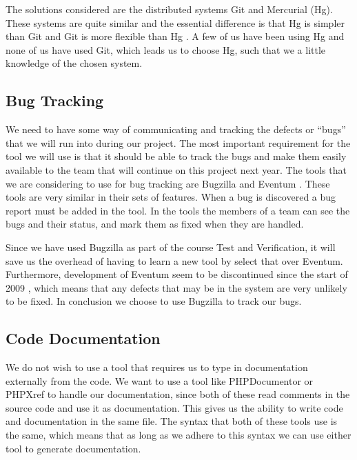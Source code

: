 The solutions considered are the distributed systems Git and Mercurial (Hg).
These systems are quite similar and the essential difference is that Hg is simpler than Git and Git is more flexible than Hg \cite{gitVsHg}.
A few of us have been using Hg and none of us have used Git, which leads us to choose Hg, such that we a little knowledge of the chosen system.

\subsection{Bug Tracking}
We need to have some way of communicating and tracking the defects or ``bugs'' that we will run into during our project.
The most important requirement for the tool we will use is that it should be able to track the bugs and make them easily available to the team that will continue on this project next year.
The tools that we are considering to use for bug tracking are Bugzilla \cite{bugzillaFeat} and Eventum \cite{eventumFeat}.
These tools are very similar in their sets of features.
When a bug is discovered a bug report must be added in the tool.
In the tools the members of a team can see the bugs and their status, and mark them as fixed when they are handled.

Since we have used Bugzilla as part of the course Test and Verification, it will save us the overhead of having to learn a new tool by select that over Eventum.
Furthermore, development of Eventum seem to be discontinued since the start of 2009 \cite{eventumDiscont}, which means that any defects that may be in the system are very unlikely to be fixed.
In conclusion we choose to use Bugzilla to track our bugs.

\subsection{Code Documentation}
We do not wish to use a tool that requires us to type in documentation externally from the code.
We want to use a tool like PHPDocumentor \cite{phpdocumentor} or PHPXref \cite{phpxref} to handle our documentation, since both of these read comments in the source code and use it as documentation.
This gives us the ability to write code and documentation in the same file.
The syntax that both of these tools use is the same, which means that as long as we adhere to this syntax we can use either tool to generate documentation.

